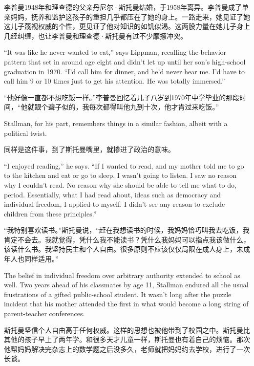 \ifdefined\chs
李普曼1948年和理查德的父亲丹尼尔·斯托曼结婚，于1958年离异。李普曼成了单亲妈妈，抚养和监护这孩子的重担几乎都压在了她的身上。一路走来，她见证了她这儿子蔑视权威的个性，更见证了他对知识的如饥似渴。这两股力量在她儿子身上几经纠缠，也让李普曼和理查德·斯托曼有过不少摩擦冲突。
\fi

\ifdefined\eng
``It was like he never wanted to eat,'' says Lippman, recalling the behavior pattern that set in around age eight and didn't let up until her son's high-school graduation in 1970. ``I'd call him for dinner, and he'd never hear me. I'd have to call him 9 or 10 times just to get his attention. He was totally immersed.''
\fi

\ifdefined\chs
``他好像一直都不想吃饭一样。''李普曼回忆着儿子八岁到1970年中学毕业的那段时间，``他就跟个聋子似的，我每次都得叫他九到十次，他才肯过来吃饭。''
\fi

\ifdefined\eng
Stallman, for his part, remembers things in a similar fashion, albeit with a political twist.
\fi

\ifdefined\chs
同样是这件事，到了斯托曼嘴里，就掺进了政治的意味。
\fi

\ifdefined\eng
``I enjoyed reading,'' he says. ``If I wanted to read, and my mother told me to go to the kitchen and eat or go to sleep, I wasn't going to listen. I saw no reason why I couldn't read. No reason why she should be able to tell me what to do, period. Essentially, what I had read about, ideas such as democracy and individual freedom, I applied to myself. I didn't see any reason to exclude children from these principles.''
\fi

\ifdefined\chs
``我特别喜欢读书。''斯托曼说，``赶在我想读书的时候，我妈妈恰巧叫我去吃饭，我肯定不会去。我就觉得，凭什么我不能读书？凭什么我妈妈可以指点我该做什么，该读什么书。我坚持民主和个人自由。很多原则不应该仅仅局限在成人身上，未成年人也同样适用。''
\fi

\ifdefined\eng
The belief in individual freedom over arbitrary authority extended to school as well. Two years ahead of his classmates by age 11, Stallman endured all the usual frustrations of a gifted public-school student. It wasn't long after the puzzle incident that his mother attended the first in what would become a long string of parent-teacher conferences.
\fi

\ifdefined\chs
斯托曼坚信个人自由高于任何权威。这样的思想也被他带到了校园之中。斯托曼比其他的孩子早上了两年学。和很多天才儿童一样，斯托曼也有着自己的烦恼。那次他帮妈妈解决完杂志上的数学题之后没多久，老师就把妈妈约去学校，进行了一次长谈。
\fi

